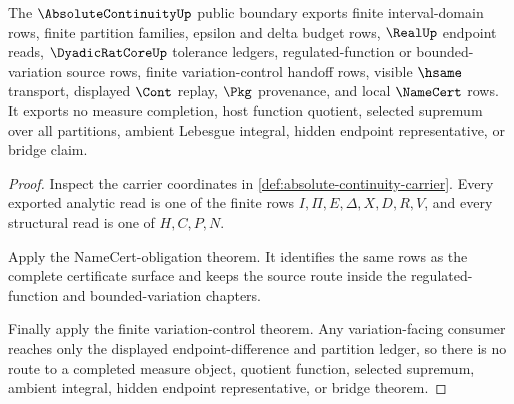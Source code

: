 \begin{theorem}
\label{thm:absolute-continuity-no-escape-boundary}
The $\AbsoluteContinuityUp$ public boundary exports finite interval-domain rows, finite partition families, epsilon and delta budget rows, $\RealUp$ endpoint reads, $\DyadicRatCoreUp$ tolerance ledgers, regulated-function or bounded-variation source rows, finite variation-control handoff rows, visible $\hsame$ transport, displayed $\Cont$ replay, $\Pkg$ provenance, and local $\NameCert$ rows. It exports no measure completion, host function quotient, selected supremum over all partitions, ambient Lebesgue integral, hidden endpoint representative, or bridge claim.
\end{theorem}
\begin{proof}
Inspect the carrier coordinates in \autoref{def:absolute-continuity-carrier}. Every exported analytic read is one of the finite rows $I,\Pi,E,\Delta,X,D,R,V$, and every structural read is one of $H,C,P,N$.

Apply the NameCert-obligation theorem. It identifies the same rows as the complete certificate surface and keeps the source route inside the regulated-function and bounded-variation chapters.

Finally apply the finite variation-control theorem. Any variation-facing consumer reaches only the displayed endpoint-difference and partition ledger, so there is no route to a completed measure object, quotient function, selected supremum, ambient integral, hidden endpoint representative, or bridge theorem.
\end{proof}

